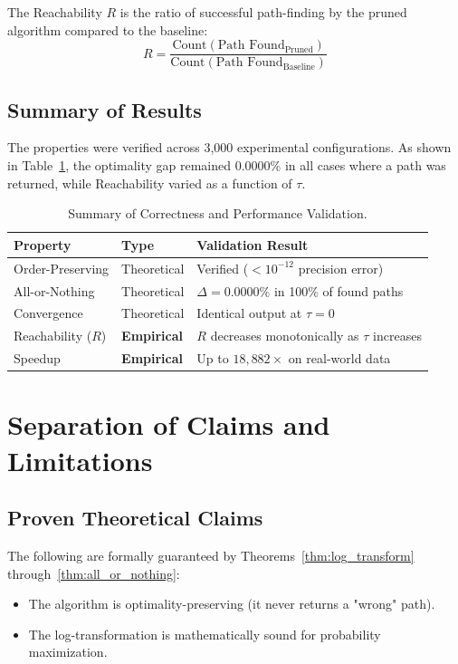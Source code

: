 \begin{definition}[Reachability]
The Reachability $R$ is the ratio of successful path-finding by the pruned algorithm compared to the baseline:
\\[-1em]
\[ R = \frac{\text{Count}(\text{Path Found}_{\text{Pruned}})}{\text{Count}(\text{Path Found}_{\text{Baseline}})} \]
\end{definition}



\subsection{Summary of Results}

The properties were verified across 3,000 experimental configurations. As shown in Table~\ref{table:correctness_summary}, the optimality gap remained $0.0000\%$ in all cases where a path was returned, while Reachability varied as a function of $\tau$.

\begin{table}[htbp]
\centering
\renewcommand{\arraystretch}{1.3}
\begin{tabular}{@{}lll@{}}
\toprule
\textbf{Property} & \textbf{Type} & \textbf{Validation Result} \\
\midrule
Order-Preserving & Theoretical & Verified ($<10^{-12}$ precision error) \\
All-or-Nothing & Theoretical & $\Delta = 0.0000\%$ in 100\% of found paths \\
Convergence & Theoretical & Identical output at $\tau = 0$ \\
Reachability ($R$) & \textbf{Empirical} & $R$ decreases monotonically as $\tau$ increases \\
Speedup & \textbf{Empirical} & Up to $18{,}882\times$ on real-world data \\
\bottomrule
\end{tabular}
\caption{Summary of Correctness and Performance Validation.}
\label{table:correctness_summary}
\end{table}

\section{Separation of Claims and Limitations}

\subsection{Proven Theoretical Claims}
The following are formally guaranteed by Theorems~\ref{thm:log_transform} through~\ref{thm:all_or_nothing}:
\begin{itemize}
    \item The algorithm is optimality-preserving (it never returns a "wrong" path).
    \item The log-transformation is mathematically sound for probability maximization.
\end{itemize}

